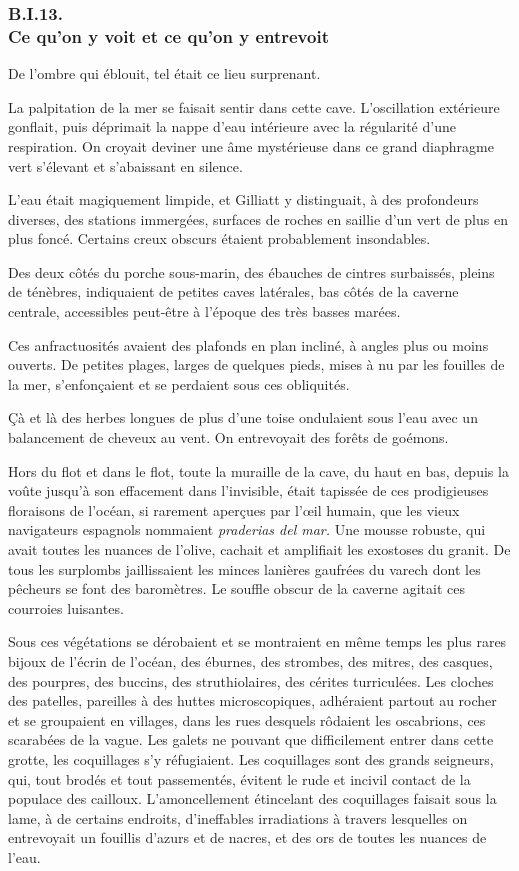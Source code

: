 \documentclass[french,twoside]{book} %
\begin{document}
 \subsubsection[{B.I.13. Ce qu’on y voit et ce qu’on y entrevoit}]{B.I.13. \\
Ce qu’on y voit et ce qu’on y entrevoit}
\noindent De l’ombre qui éblouit, tel était ce lieu surprenant.\par
La palpitation de la mer se faisait sentir dans cette cave. L’oscillation extérieure gonflait, puis déprimait la nappe d’eau intérieure avec la régularité d’une respiration. On croyait deviner une âme mystérieuse dans ce grand diaphragme vert s’élevant et s’abaissant en silence.\par
L’eau était magiquement limpide, et Gilliatt y distinguait, à des profondeurs diverses, des stations immergées, surfaces de roches en saillie d’un vert de plus en plus foncé. Certains creux obscurs étaient probablement insondables.\par
Des deux côtés du porche sous-marin, des ébauches de cintres surbaissés, pleins de ténèbres, indiquaient de petites caves latérales, bas côtés de la caverne centrale, accessibles peut-être à l’époque des très basses marées.\par
Ces anfractuosités avaient des plafonds en plan  incliné, à angles plus ou moins ouverts. De petites plages, larges de quelques pieds, mises à nu par les fouilles de la mer, s’enfonçaient et se perdaient sous ces obliquités.\par
Çà et là des herbes longues de plus d’une toise ondulaient sous l’eau avec un balancement de cheveux au vent. On entrevoyait des forêts de goémons.\par
Hors du flot et dans le flot, toute la muraille de la cave, du haut en bas, depuis la voûte jusqu’à son effacement dans l’invisible, était tapissée de ces prodigieuses floraisons de l’océan, si rarement aperçues par l’œil humain, que les vieux navigateurs espagnols nommaient \emph{praderias del mar.} Une mousse robuste, qui avait toutes les nuances de l’olive, cachait et amplifiait les exostoses du granit. De tous les surplombs jaillissaient les minces lanières gaufrées du varech dont les pêcheurs se font des baromètres. Le souffle obscur de la caverne agitait ces courroies luisantes.\par
Sous ces végétations se dérobaient et se montraient en même temps les plus rares bijoux de l’écrin de l’océan, des éburnes, des strombes, des mitres, des casques, des pourpres, des buccins, des struthiolaires, des cérites turriculées. Les cloches des patelles, pareilles à des huttes microscopiques, adhéraient partout au rocher et se groupaient en villages, dans les rues desquels rôdaient les oscabrions, ces scarabées de la vague. Les galets ne pouvant que difficilement entrer dans cette grotte, les coquillages s’y  réfugiaient. Les coquillages sont des grands seigneurs, qui, tout brodés et tout passementés, évitent le rude et incivil contact de la populace des cailloux. L’amoncellement étincelant des coquillages faisait sous la lame, à de certains endroits, d’ineffables irradiations à travers lesquelles on entrevoyait un fouillis d’azurs et de nacres, et des ors de toutes les nuances de l’eau.\par
\end{document}
